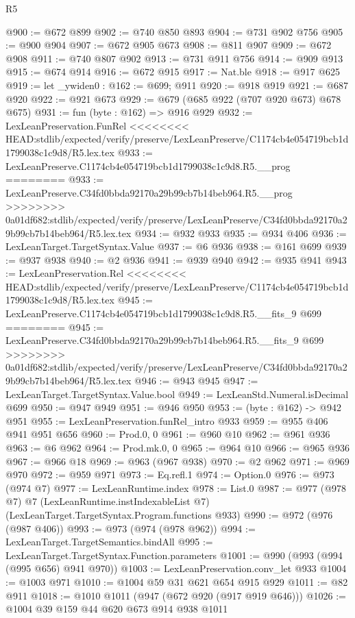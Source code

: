 \begin{lexlean}{R5}
\begin{coremodule}
{{{{{{{{{{{{{{{{{{{@900 := @672 @899
@902 := @740 @850 @893
@904 := @731 @902 @756
@905 := @900 @904
@907 := @672 @905 @673
@908 := @811 @907
@909 := @672 @908
@911 := @740 @807 @902
@913 := @731 @911 @756
@914 := @909 @913
@915 := @674 @914
@916 := @672 @915
@917 := Nat.ble
@918 := @917 @625
@919 := let _ywiden0 : @162 := @699; @911
@920 := @918 @919
@921 := @687 @920
@922 := @921 @673
@929 := @679 (@685 @922 (@707 @920 @673) @678 @675)
@931 := fun (byte : @162) => @916 @929
@932 := LexLeanPreservation.FunRel
<<<<<<<< HEAD:stdlib/expected/verify/preserve/LexLeanPreserve/C1174cb4e054719bcb1d1799038c1c9d8/R5.lex.tex
@933 := LexLeanPreserve.C1174cb4e054719bcb1d1799038c1c9d8.R5.__prog
========
@933 := LexLeanPreserve.C34fd0bbda92170a29b99cb7b14beb964.R5.__prog
>>>>>>>> 0a01df682:stdlib/expected/verify/preserve/LexLeanPreserve/C34fd0bbda92170a29b99cb7b14beb964/R5.lex.tex
@934 := @932 @933
@935 := @934 @406
@936 := LexLeanTarget.TargetSyntax.Value
@937 := @6 @936
@938 := @161 @699
@939 := @937 @938
@940 := @2 @936
@941 := @939 @940
@942 := @935 @941
@943 := LexLeanPreservation.Rel
<<<<<<<< HEAD:stdlib/expected/verify/preserve/LexLeanPreserve/C1174cb4e054719bcb1d1799038c1c9d8/R5.lex.tex
@945 := LexLeanPreserve.C1174cb4e054719bcb1d1799038c1c9d8.R5.__fits_9 @699
========
@945 := LexLeanPreserve.C34fd0bbda92170a29b99cb7b14beb964.R5.__fits_9 @699
>>>>>>>> 0a01df682:stdlib/expected/verify/preserve/LexLeanPreserve/C34fd0bbda92170a29b99cb7b14beb964/R5.lex.tex
@946 := @943 @945
@947 := LexLeanTarget.TargetSyntax.Value.bool
@949 := LexLeanStd.Numeral.isDecimal @699
@950 := @947 @949
@951 := @946 @950
@953 := (byte : @162) -> @942 @951
@955 := LexLeanPreservation.funRel_intro @933
@959 := @955 @406 @941 @951 @656
@960 := Prod.{0, 0}
@961 := @960 @10
@962 := @961 @936
@963 := @6 @962
@964 := Prod.mk.{0, 0}
@965 := @964 @10
@966 := @965 @936
@967 := @966 @18
@969 := @963 (@967 @938)
@970 := @2 @962
@971 := @969 @970
@972 := @959 @971
@973 := Eq.refl.{1}
@974 := Option.{0}
@976 := @973 (@974 @7)
@977 := LexLeanRuntime.index
@978 := List.{0}
@987 := @977
    (@978 @7)
    @7
    (LexLeanRuntime.instIndexableList @7)
    (LexLeanTarget.TargetSyntax.Program.functions @933)
@990 := @972 (@976 (@987 @406))
@993 := @973 (@974 (@978 @962))
@994 := LexLeanTarget.TargetSemantics.bindAll
@995 := LexLeanTarget.TargetSyntax.Function.parameters
@1001 := @990 (@993 (@994 (@995 @656) @941 @970))
@1003 := LexLeanPreservation.conv_let @933
@1004 := @1003 @971
@1010 := @1004 @59 @31 @621 @654 @915 @929
@1011 := @82 @911
@1018 := @1010 @1011 (@947 (@672 @920 (@917 @919 @646)))
@1026 := @1004 @39 @159 @44 @620 @673 @914 @938 @1011
}}}}}}}}}}}}}}}}}}}
\end{coremodule}
\end{lexlean}
